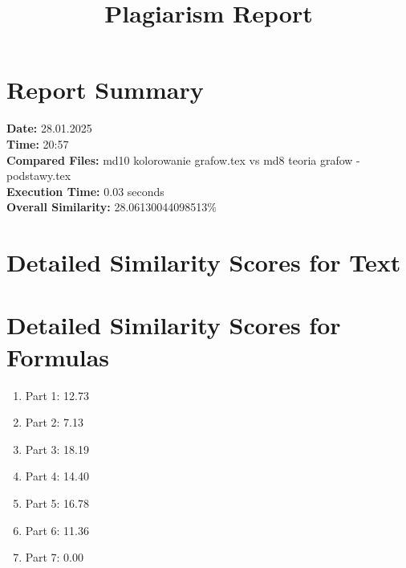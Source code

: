 \documentclass[12pt]{article}
\title{Plagiarism Report}
\begin{document}
\maketitle
\section*{Report Summary}
\textbf{Date:} 28.01.2025\\
\textbf{Time:} 20:57\\
\textbf{Compared Files:} md10 kolorowanie grafow.tex vs md8 teoria grafow - podstawy.tex\\
\textbf{Execution Time:} 0.03 seconds\\
\textbf{Overall Similarity:} 28.06130044098513\%

\section*{Detailed Similarity Scores for Text}
\begin{enumerate}
\it
\end{enumerate}

\section*{Detailed Similarity Scores for Formulas}
\begin{enumerate}
\item Part 1: 12.73%
\item Part 2: 7.13%
\item Part 3: 18.19%
\item Part 4: 14.40%
\item Part 5: 16.78%
\item Part 6: 11.36%
\item Part 7: 0.00%
\end{enumerate}
\end{document}
